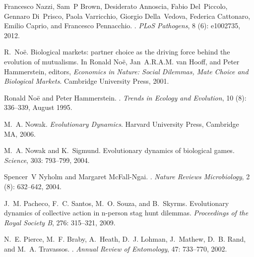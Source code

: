 \documentclass[12pt]{article}
\begin{document}
\begin{thebibliography}{61}
Francesco Nazzi, Sam~P Brown, Desiderato Annoscia, Fabio Del~Piccolo, Gennaro
  Di~Prisco, Paola Varricchio, Giorgio Della~Vedova, Federica Cattonaro, Emilio
  Caprio, and Francesco Pennacchio.
.
\newblock \emph{PLoS Pathogens}, 8 (6): e1002735, 2012.

R.~No{\"e}.
\newblock Biological markets: partner choice as the driving force behind the
  evolution of mutualisms.
\newblock In Ronald No{\"e}, Jan~A.R.A.M. van Hooff, and Peter Hammerstein,
  editors, \emph{Economics in Nature: Social Dilemmas, Mate Choice and
  Biological Markets}. Cambridge University Press, 2001.

Ronald No{\"e} and Peter Hammerstein.
.
\newblock \emph{Trends in Ecology and Evolution}, 10 (8):
  336--339, August 1995.

M.~A. Nowak.
\newblock \emph{Evolutionary Dynamics}.
\newblock Harvard University Press, Cambridge MA, 2006.

M.~A. Nowak and K.~Sigmund.
\newblock Evolutionary dynamics of biological games.
\newblock \emph{Science}, 303: 793--799, 2004.

Spencer~V Nyholm and Margaret McFall-Ngai.
.
\newblock \emph{Nature Reviews Microbiology}, 2 (8):
  632--642, 2004.

J.~M. Pacheco, F.~C. Santos, M.~O. Souza, and B.~Skyrms.
\newblock Evolutionary dynamics of collective action in n-person stag hunt
  dilemmas.
\newblock \emph{Proceedings of the Royal Society B}, 276: 315--321,
  2009.

N.~E. Pierce, M.~F. Braby, A.~Heath, D.~J. Lohman, J.~Mathew, D.~B. Rand, and
  M.~A. Travassos.
.
\newblock \emph{Annual Review of Entomology}, 47: 733--770, 2002.


\end{thebibliography}
\end{document}

